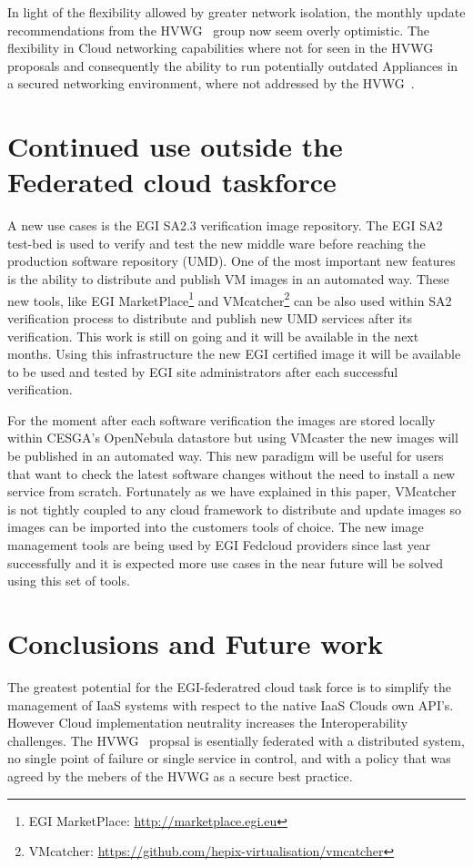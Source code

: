 \documentclass{llncs_Ibergrid2013}
\begin{document}
In light of the flexibility allowed by greater network isolation, the monthly update recommendations from the HVWG~\cite{hepix} group now seem overly optimistic. The flexibility in Cloud networking capabilities where not for seen in the HVWG~\cite{hepix} proposals and consequently the ability to run potentially outdated Appliances in a secured networking environment, where not addressed by the HVWG~\cite{hepix}.
\section{Continued use outside the Federated cloud taskforce}
\label{sect-continued}

A new use cases is the EGI SA2.3 verification image repository. The EGI SA2 test-bed is used to verify and test the new middle ware before reaching the production software repository (UMD).
One of the most important new features is the ability to distribute and publish VM images in an automated way. 
These new tools, like EGI MarketPlace\footnote{EGI MarketPlace: \url{http://marketplace.egi.eu}} and VMcatcher\footnote{VMcatcher: \url{https://github.com/hepix-virtualisation/vmcatcher}} can be also used within SA2 verification process to distribute and publish new UMD services after its verification. 
This work is still on going and it will be available in the next months. Using this infrastructure the new EGI certified image it will be available to be used and tested by EGI site administrators after each successful verification.

For the moment after each software verification the images are stored locally within CESGA's OpenNebula datastore but using VMcaster the new images will be published in an automated way.
This new paradigm will be useful for users that want to check the latest software changes without the need to install a new service from scratch.
Fortunately as we have explained in this paper, VMcatcher~\cite{vmcatcher} is not tightly coupled to any cloud framework to distribute and update images so images can be imported into the customers tools of choice. The new image management tools are being used by EGI Fedcloud providers since last year successfully and it is expected more use cases in the near future will be solved using this set of tools.

\section{Conclusions and Future work}
\label{sect-conclusions}
The greatest potential for the EGI-federatred cloud task force is to simplify the management of IaaS systems with respect to the native IaaS Clouds own API's. However Cloud implementation neutrality increases the Interoperability challenges. The HVWG~\cite{hepix} propsal is esentially federated with a distributed system, no single point of failure or single service in control, and with a policy that was agreed by the mebers of the HVWG as a secure best practice.
\end{document}
